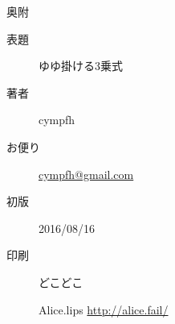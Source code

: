 \vspace*{110mm}
\begin{flushright}
\begin{minipage}{70mm}
\begin{itembox}{ 奥附 }
  \begin{description}
    \item[表題] ゆゆ掛ける3乗式
    \item[著者] cympfh
    \item[お便り] \url{cympfh@gmail.com}
    \item[初版] 2016/08/16
    \item[印刷] どこどこ
    \item[] \hspace*{-10pt} Alice.lips \url{http://alice.fail/}
  \end{description}
\end{itembox}
\end{minipage}
\end{flushright}
